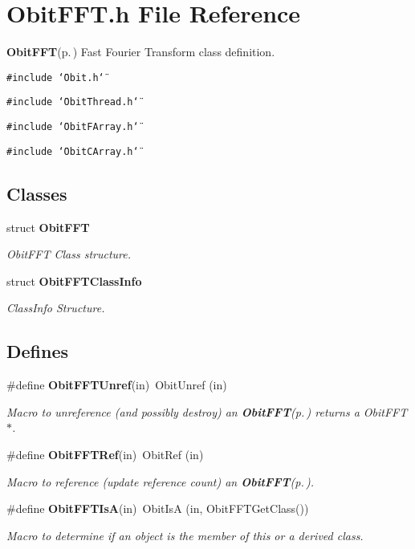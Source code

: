 \section{Obit\-FFT.h File Reference}
\label{ObitFFT_8h}
{\bf Obit\-FFT}{\rm (p.\,\pageref{structObitFFT})} Fast Fourier Transform class definition. 

{\tt \#include \char`\"{}Obit.h\char`\"{}}\par
{\tt \#include \char`\"{}Obit\-Thread.h\char`\"{}}\par
{\tt \#include \char`\"{}Obit\-FArray.h\char`\"{}}\par
{\tt \#include \char`\"{}Obit\-CArray.h\char`\"{}}\par
\subsection*{Classes}
\begin{CompactItemize}
\item 
struct {\bf Obit\-FFT}
\begin{CompactList}\small\item\em Obit\-FFT Class structure. \item\end{CompactList}\item 
struct {\bf Obit\-FFTClass\-Info}
\begin{CompactList}\small\item\em Class\-Info Structure. \item\end{CompactList}\end{CompactItemize}
\subsection*{Defines}
\begin{CompactItemize}
\item 
\#define {\bf Obit\-FFTUnref}(in)\ Obit\-Unref (in)
\begin{CompactList}\small\item\em Macro to unreference (and possibly destroy) an {\bf Obit\-FFT}{\rm (p.\,\pageref{structObitFFT})} returns a Obit\-FFT$\ast$. \item\end{CompactList}\item 
\#define {\bf Obit\-FFTRef}(in)\ Obit\-Ref (in)
\begin{CompactList}\small\item\em Macro to reference (update reference count) an {\bf Obit\-FFT}{\rm (p.\,\pageref{structObitFFT})}. \item\end{CompactList}\item 
\#define {\bf Obit\-FFTIs\-A}(in)\ Obit\-Is\-A (in, Obit\-FFTGet\-Class())
\begin{CompactList}\small\item\em Macro to determine if an object is the member of this or a derived class. \item\end{CompactList}\end{CompactItemize}
